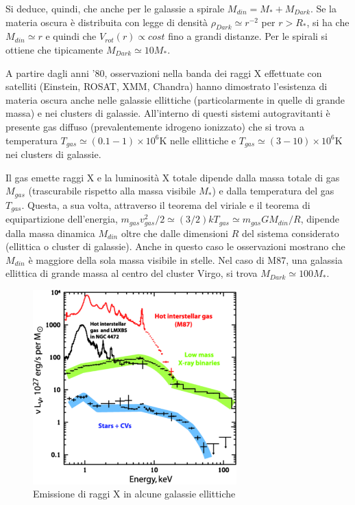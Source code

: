 Si deduce, quindi, che anche per le galassie a spirale $M_{din} = M_{*} +
M_{Dark}$. Se la materia oscura è distribuita con legge di densità $\rho_{Dark}
\simeq r^{-2}$ per $r>R_*$, si ha che $M_{din} \simeq r$ e quindi che
$V_{rot}(r) \propto cost$ fino a grandi distanze. Per le spirali si ottiene che
tipicamente $M_{Dark} \simeq 10 M_{*}$.

A partire dagli anni '80, osservazioni nella banda dei raggi X effettuate con
satelliti (Einstein, ROSAT, XMM, Chandra) hanno dimostrato l'esistenza di
materia oscura anche nelle galassie ellittiche (particolarmente in quelle di
grande massa) e nei clusters di galassie.  All'interno di questi sistemi
autogravitanti è presente gas diffuso (prevalentemente idrogeno ionizzato) che
si trova a temperatura $T_{gas }\simeq (0.1-1) \times 10^6$K nelle ellittiche e
$T_{gas }\simeq (3-10) \times 10^6$K nei clusters di galassie.

Il gas emette raggi X e la luminosità X totale dipende dalla massa totale di gas
$M_{gas}$ (trascurabile rispetto alla massa visibile $M_*$) e dalla temperatura
del gas $T_{gas}$.  Questa, a sua volta, attraverso il teorema del viriale e il
teorema di equipartizione dell'energia, $ m_{gas} v^2_{gas} /2 \simeq (3/2)
kT_{gas} \simeq m_{gas} G M_{din} /R$, dipende dalla massa dinamica $M_{din}$
oltre che dalle dimensioni $R$ del sistema considerato (ellittica o cluster di
galassie).  Anche in questo caso le osservazioni mostrano che $M_{din}$ è
maggiore della sola massa visibile in stelle.  Nel caso di M87, una galassia
ellittica di grande massa al centro del cluster Virgo, si trova $M_{Dark} \simeq
100 M_{*}$.
\begin{figure}
  \centering{}
  \includegraphics[width=0.7\textwidth]{figure/Xray_ellipt.pdf}
  \caption{Emissione di raggi X in alcune galassie ellittiche}
  \label{XRay_ell}
\end{figure}

